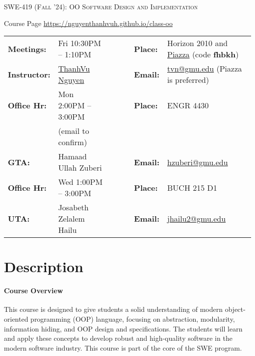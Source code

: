 \documentclass[11pt]{article}
\begin{document}
\begin{center}
{\Large \textsc{SWE-419 (Fall '24): OO Software Design and Implementation}}
\end{center}
\begin{center}
Course Page \url{https://nguyenthanhvuh.github.io/class-oo}
\end{center}



\begin{minipage}[t]{.75\textwidth}
    \centering
\begin{tabular}{llcccll}
  \toprule
  \textbf{Meetings:} & Fri 10:30PM -- 1:10PM  & & & & \textbf{Place:} & Horizon 2010 and \href{https://piazza.com/gmu/fall2024/swe419nguyen}{Piazza} (code \textbf{fhbkh})\\
\textbf{Instructor:} & \href{https://go.gmu.edu/tvn}{ThanhVu Nguyen} & & &  & \textbf{Email:} &  \href{mailto:tvn@gmu.edu}{tvn@gmu.edu} (Piazza is preferred)\\
\textbf{Office Hr:} & Mon 2:00PM -- 3:00PM & & & & \textbf{Place:} & ENGR 4430\\
                     &(email to confirm)&&&&&\\
  \hline
\textbf{GTA:} & Hamaad Ullah Zuberi & & &  & \textbf{Email:} &  \href{mailto:hzuberi@gmu.edu}{hzuberi@gmu.edu}\\
\textbf{Office Hr:} & Wed 1:00PM -- 3:00PM & & & & \textbf{Place:} & BUCH 215 D1 \\
  \hline
\textbf{UTA:} & Josabeth Zelalem Hailu & & &  & \textbf{Email:} &  \href{mailto:jhailu2@gmu.edu}{jhailu2@gmu.edu}\\
\bottomrule
\end{tabular}
\end{minipage}
 

\section{Description}

\paragraph{Course Overview}
This course is designed to give students a solid understanding of modern object-oriented programming (OOP) language, focusing on abstraction, modularity, information hiding, and OOP design and specifications. The students will learn and apply these concepts to develop robust and high-quality software in the modern software industry.  This course is part of the core of the SWE program.
\end{document}
